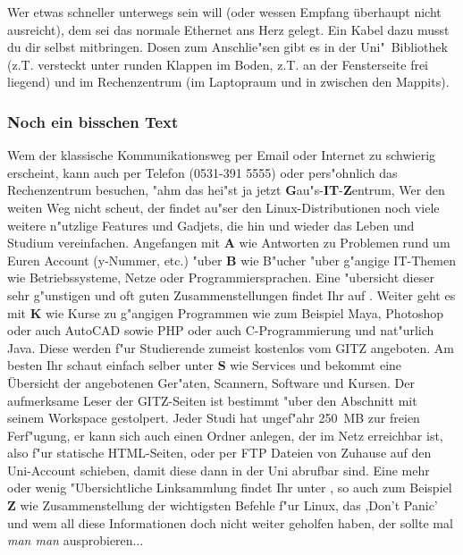 Wer etwas schneller unterwegs sein will (oder wessen Empfang überhaupt 
nicht ausreicht), dem sei das normale Ethernet ans
Herz gelegt. Ein Kabel dazu musst du dir selbst mitbringen. Dosen zum
Anschlie"sen gibt es in der Uni"~Bibliothek (z.T. versteckt unter runden
Klappen im Boden, z.T. an der Fensterseite frei liegend) und im
Rechenzentrum (im Laptopraum  und in  zwischen den
Mappits).

\subsubsection{Noch ein bisschen Text}
Wem der klassische Kommunikationsweg per Email  oder Internet \mbox{} zu schwierig erscheint, kann auch per Telefon (0531-391 5555) oder pers"ohnlich das Rechenzentrum besuchen, "ahm das hei"st ja jetzt \textbf{G}au"s-\textbf{IT}-\textbf{Z}entrum, Wer den weiten Weg nicht scheut, der findet au"ser den Linux-Distributionen noch viele weitere n"utzlige Features und Gadjets, die hin und wieder das Leben und Studium vereinfachen. Angefangen mit \textbf{A} wie Antworten zu Problemen rund um Euren Account (y-Nummer, etc.)
"uber \textbf{B} wie B"ucher "uber g"angige IT-Themen wie Betriebssysteme, Netze oder Programmiersprachen. Eine "ubersicht dieser sehr g"unstigen und oft guten Zusammenstellungen findet Ihr auf . Weiter geht es mit \textbf{K} wie Kurse  zu g"angigen Programmen wie zum Beispiel Maya, Photoshop oder auch AutoCAD sowie PHP oder auch C-Programmierung und nat"urlich Java. Diese werden f"ur Studierende zumeist kostenlos vom GITZ angeboten. Am besten Ihr schaut einfach selber unter \textbf{S} wie Services  und bekommt eine Übersicht der angebotenen Ger"aten, Scannern, Software und Kursen.\newline
Der aufmerksame Leser der GITZ-Seiten ist bestimmt "uber den Abschnitt mit seinem Workspace gestolpert. Jeder Studi hat ungef"ahr 250~MB zur freien Ferf"ugung, er kann sich auch einen Ordner anlegen, der im Netz erreichbar ist, also f"ur statische HTML-Seiten, oder per FTP Dateien von Zuhause auf den Uni-Account schieben, damit diese dann in der Uni abrufbar sind.\newline
Eine mehr oder wenig "Ubersichtliche Linksammlung findet Ihr unter , so auch zum Beispiel \textbf{Z} wie Zusammenstellung der wichtigsten Befehle f"ur Linux, das ,Don't Panic' 
und wem all diese Informationen doch nicht weiter geholfen haben, der sollte mal \textit{man man} ausprobieren...